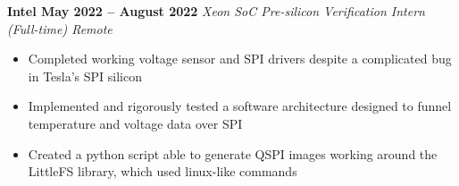 \documentclass[../main.tex]{subfiles}
\begin{document}
%
\noindent\textbf{{\fontsize{\textFontSize}{\textFontBox}\selectfont Intel \hfill May 2022 – August 2022}}
\vspace{\jobHeaderDist}\newline
%
{\fontsize{\textFontSize}{\textFontBox}\selectfont\emph{Xeon SoC Pre-silicon Verification Intern (Full-time) \hfill Remote \hspace{0 cm}}}\newline
\vspace{\listHeight}
%
%
\begin{itemize}
  \setlength{\itemindent}{-6mm}
  \vspace{\listItemDist}\item {\fontsize{\textFontSize}{\textFontBox}\selectfont Completed working voltage sensor and SPI drivers despite a complicated bug in Tesla’s SPI silicon}
  \vspace{\listItemDistTwo}\item {\fontsize{\textFontSize}{\textFontBox}\selectfont Implemented and rigorously tested a software architecture designed to funnel temperature and voltage data over SPI}
  \vspace{\listItemDistTwo}\item {\fontsize{\textFontSize}{\textFontBox}\selectfont Created a python script able to generate QSPI images working around the LittleFS library, which used linux-like commands}
\end{itemize}
%
%
%
\end{document}
